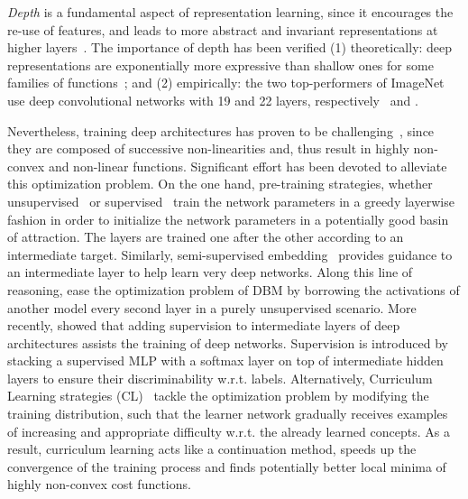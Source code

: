 \documentclass{article} %
\begin{document}
\emph{Depth} is a fundamental aspect of
representation learning, since it encourages the re-use of features, and leads
to more abstract and invariant representations at higher layers~\citep{bengio.2013}. The importance of depth has been verified (1)
theoretically: deep representations are exponentially more expressive than
shallow ones for some families of functions~\citep{Montufar14};
and (2) empirically: the two top-performers of ImageNet use deep convolutional
networks with 19 and 22 layers, respectively~\citep{simonyan.2014} and \citep{Szegedy14}.

Nevertheless, training deep architectures has proven to be
challenging~\citep{Larochelle07, Erhan09}, since they are composed of
successive non-linearities and, thus result in highly non-convex and
non-linear functions. Significant effort has been devoted to alleviate
this optimization problem. On the one hand, pre-training strategies, whether
unsupervised~\citep{Hinton06_NC,Bengio07} or supervised~\citep{Bengio07} train the network parameters in a greedy
layerwise fashion in order to initialize the network parameters in a
potentially good basin of attraction. The layers are trained one after the
other according to an intermediate target. Similarly, semi-supervised embedding~\citep{WestonJ2008-small}
provides guidance to an intermediate layer to help learn very deep networks. Along this line of reasoning, \citep{Cho12} ease the optimization problem of DBM by borrowing the activations of another model every second layer in a purely unsupervised scenario.
More recently, \citep{Lee14,Szegedy14,Gulcehre13} showed that adding
supervision to intermediate layers of deep architectures assists the training
of deep networks. Supervision is introduced by stacking a supervised MLP with a softmax layer
on top of intermediate hidden layers to ensure their discriminability
w.r.t. labels. Alternatively, Curriculum Learning
strategies (CL)~\citep{bengio.2009} tackle the optimization problem
by modifying the training distribution, such that the learner
network gradually receives examples of increasing and appropriate difficulty w.r.t. the already learned concepts. As a result, curriculum learning acts like
a continuation method, speeds up the convergence of the training process and finds potentially better
local minima of highly non-convex cost functions.
\end{document}
